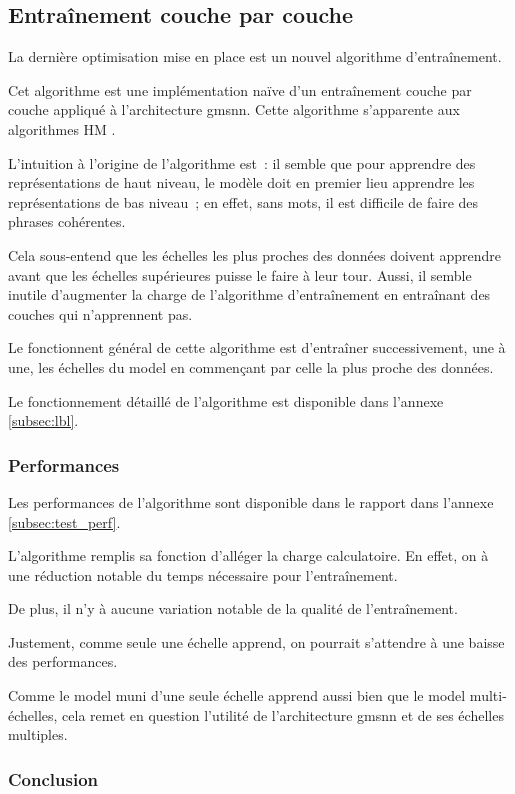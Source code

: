 \subsection{Entraînement couche par couche}\label{subsec:optilbl}
La dernière optimisation mise en place est un nouvel algorithme d'entraînement.

Cet algorithme est une implémentation naïve d'un entraînement couche par couche appliqué à l'architecture \gls{gmsnn}. Cette algorithme s'apparente aux algorithmes HM \autocite{hm}.

L'intuition à l'origine de l'algorithme est~:
il semble que pour apprendre des représentations de haut niveau, le modèle doit en premier lieu apprendre les représentations de bas niveau~;
en effet, sans mots, il est difficile de faire des phrases cohérentes.

Cela sous-entend que les échelles les plus proches des données doivent apprendre avant que les échelles supérieures puisse le faire à leur tour.
Aussi, il semble inutile d'augmenter la charge de l'algorithme d'entraînement en entraînant des couches qui n'apprennent pas.

Le fonctionnent général de cette algorithme est d'entraîner successivement, une à une, les échelles du \gls{model} en commençant par celle la plus proche des données.

Le fonctionnement détaillé de l'algorithme est disponible dans l'annexe \ref{subsec:lbl}.

\subsubsection{Performances}
Les performances de l'algorithme sont disponible dans le rapport dans l'annexe \ref{subsec:test_perf}.

L'algorithme remplis sa fonction d'alléger la charge calculatoire. En effet, on à une réduction notable du temps nécessaire pour l'entraînement. %

De plus, il n'y à aucune variation notable de la qualité de l'entraînement.

Justement, comme seule une échelle apprend, on pourrait s'attendre à une baisse des performances.%

Comme le \gls{model} muni d'une seule échelle apprend aussi bien que le \gls{model} multi-échelles, cela remet en question l'utilité de l'architecture \gls{gmsnn} et de ses échelles multiples.

\subsubsection{Conclusion}
